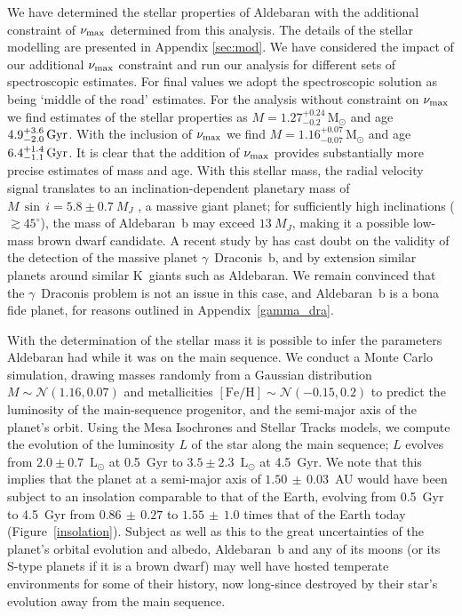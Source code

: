 \documentclass[modern]{aastex61}
\newcommand{\numax}{\mbox{$\nu_{\rm max}$}\xspace}
\newcommand{\lsun}{\mbox{$\mathrm{L}_{\odot}$}\xspace}
\begin{document}
We have determined the stellar properties
of Aldebaran with the additional constraint of \numax determined from this
analysis.  The details of the stellar modelling are presented in Appendix
\ref{sec:mod}.  We have considered the impact of our additional \numax
constraint and run our analysis for different sets of spectroscopic estimates.
For final values we adopt the \citet{2012Sheffield} spectroscopic solution as
being `middle of the road' estimates.  For the analysis without constraint on
\numax we find estimates of the stellar properties as $M = 1.27^{+0.24}_{-0.2}
\, \mathrm{M_{\odot}}$ and age $4.9^{+3.6}_{-2.0} \, \rm Gyr$.  With the
inclusion of \numax we find $M = 1.16^{+0.07}_{-0.07} \, \mathrm{M_{\odot}}$ and
age $6.4^{+1.4}_{-1.1} \, \rm Gyr$.  It is clear that the addition of \numax
provides substantially more precise estimates of mass and age. With this stellar
mass, the radial velocity signal translates to an inclination-dependent
planetary mass of $M\,\sin\,{i} = 5.8 \pm 0.7~M_J$
\citep[Equation~1]{Torres2008}, a massive giant planet; for sufficiently high
inclinations ($\gtrsim 45^\circ$), the mass of Aldebaran~b may exceed $13~M_J$,
making it a possible low-mass brown dwarf candidate. A recent study by \citet{2018arXiv180105239H} has cast doubt on the validity of the detection of the massive planet $\gamma$~Draconis~b, and by extension similar planets around similar K~giants such as Aldebaran. We remain convinced that the $\gamma$~Draconis problem is not an issue in this case, and Aldebaran~b is a bona fide planet, for reasons outlined in Appendix~\ref{gamma_dra}.

With the determination of the stellar mass it is possible to infer the parameters Aldebaran had while it was on the main sequence. We conduct a Monte Carlo simulation, drawing masses randomly from a Gaussian distribution $M \sim \mathcal{N}(1.16,0.07)$ and metallicities $[\text{Fe}/\text{H}] \sim \mathcal{N}(-0.15,0.2)$ \citep{decin2003} to predict the luminosity of the main-sequence progenitor, and the semi-major axis of the planet's orbit.
Using the Mesa Isochrones and Stellar Tracks \citep[MIST:][]{mist0,mist1} models, we compute the evolution of the luminosity $L$ of the star along the main sequence; $L$ evolves from $2.0 \pm 0.7$~\lsun at 0.5~Gyr to $3.5 \pm 2.3$~\lsun at 4.5~Gyr.
We note that this implies that the planet at a semi-major axis of $1.50\, \pm\, 0.03$~AU would have been subject to an insolation comparable to that of the Earth, evolving from 0.5~Gyr to 4.5~Gyr from $0.86\, \pm\, 0.27$ to $1.55 \,\pm\,1.0$ times that of the Earth today (Figure~\ref{insolation}). Subject as well as this to the great uncertainties of the planet's orbital evolution and albedo, Aldebaran~b and any of its moons (or its S-type planets if it is a brown dwarf) may well have hosted temperate environments for some of their history, now long-since destroyed by their star's evolution away from the main sequence.
\end{document}
